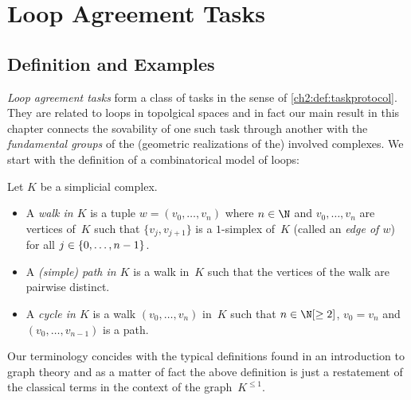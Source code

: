 \chapter{Loop Agreement Tasks}
\section{Definition and Examples}
\emph{Loop agreement tasks} form a class of tasks in the sense of
\cref{ch2:def:taskprotocol}. They are related to loops in topolgical spaces
and in fact our main result in this chapter 
connects the sovability of one such task through another with the
\emph{fundamental groups} of the (geometric realizations of the)
involved complexes. We start with the definition of a combinatorical
model of loops:

\begin{thDef}
    Let $K$ be a simplicial complex.
    \begin{itemize}
        \item
            A \emph{walk in $K$} is a tuple $w = (v_0,\dots,v_n)$
            where $n\in\N$ and $v_0,\dots,v_n$ are vertices
            of~$K$ such that $\{v_j,v_{j+1}\}$ is a $1$-simplex of~$K$
            (called an \emph{edge of $w$}) for all $j\in\{0,\ldots,n-1\}$.
            
        \item
            A \emph{(simple) path in $K$} is a walk in~$K$ such that the
            vertices of the walk are pairwise distinct.
            
        \item
            A \emph{cycle in $K$} is a walk $(v_0,\dots,v_n)$ in~$K$ such that
            $n\in\N[\geq2]$, $v_0 = v_n$ and $(v_0,\dots,v_{n-1})$ is a path.
    \end{itemize}
\end{thDef}

Our terminology concides with the typical definitions found in an introduction
to graph theory and as a matter of fact the above definition is just a
restatement of the classical terms in the context of the graph~$K^{\leq 1}$.

